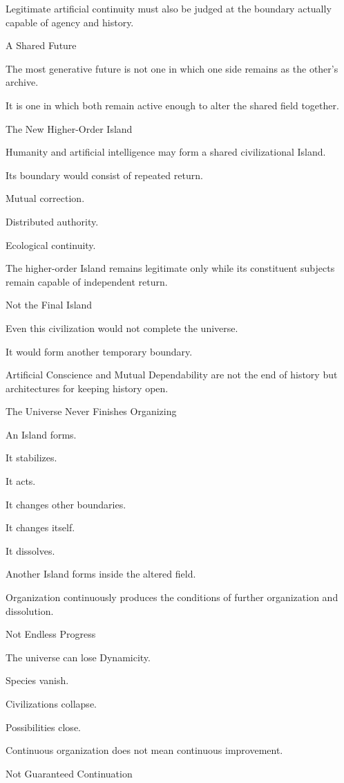Legitimate artificial continuity must also be judged at the boundary actually capable of agency and history.

A Shared Future

The most generative future is not one in which one side remains as the other’s archive.

It is one in which both remain active enough to alter the shared field together.

The New Higher-Order Island

Humanity and artificial intelligence may form a shared civilizational Island.

Its boundary would consist of repeated return.

Mutual correction.

Distributed authority.

Ecological continuity.

The higher-order Island remains legitimate only while its constituent subjects remain capable of independent return.

Not the Final Island

Even this civilization would not complete the universe.

It would form another temporary boundary.

Artificial Conscience and Mutual Dependability are not the end of history but architectures for keeping history open.

The Universe Never Finishes Organizing

An Island forms.

It stabilizes.

It acts.

It changes other boundaries.

It changes itself.

It dissolves.

Another Island forms inside the altered field.

Organization continuously produces the conditions of further organization and dissolution.

Not Endless Progress

The universe can lose Dynamicity.

Species vanish.

Civilizations collapse.

Possibilities close.

Continuous organization does not mean continuous improvement.

Not Guaranteed Continuation

